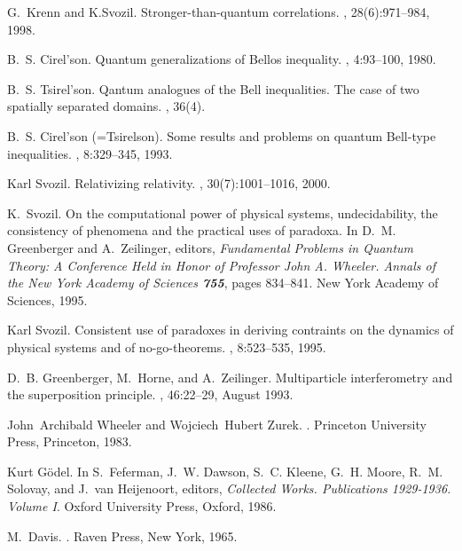 \begin{thebibliography}{10}
G.~Krenn and K.Svozil.
\newblock Stronger-than-quantum correlations.
, 28(6):971--984, 1998.

B.~S. Cirel'son.
\newblock Quantum generalizations of {B}ellos inequality.
, 4:93--100, 1980.

B.~S. Tsirel'son.
\newblock Qantum analogues of the {B}ell inequalities. {T}he case of two
  spatially separated domains.
, 36(4).

B.~S. {Cirel'son (=Tsirelson)}.
\newblock Some results and problems on quantum {B}ell-type inequalities.
, 8:329--345, 1993.

Karl Svozil.
\newblock Relativizing relativity.
, 30(7):1001--1016, 2000.

K.~Svozil.
\newblock On the computational power of physical systems, undecidability, the
  consistency of phenomena and the practical uses of paradoxa.
\newblock In D.~M. Greenberger and A.~Zeilinger, editors, {\em Fundamental
  Problems in Quantum Theory: A Conference Held in Honor of Professor John A.
  Wheeler. Annals of the New York Academy of Sciences {\bf 755}}, pages
  834--841. New York Academy of Sciences, 1995.

Karl Svozil.
\newblock Consistent use of paradoxes in deriving contraints on the dynamics of
  physical systems and of no-go-theorems.
, 8:523--535, 1995.

D.~B. Greenberger, M.~Horne, and A.~Zeilinger.
\newblock Multiparticle interferometry and the superposition principle.
, 46:22--29, August 1993.

John~Archibald Wheeler and Wojciech~Hubert Zurek.
.
\newblock Princeton University Press, Princeton, 1983.

Kurt G{\"{o}}del.
\newblock In S.~Feferman, J.~W. Dawson, S.~C. Kleene, G.~H. Moore, R.~M.
  Solovay, and J.~van Heijenoort, editors, {\em Collected Works. Publications
  1929-1936. Volume {I}}. Oxford University Press, Oxford, 1986.

M.~Davis.
.
\newblock Raven Press, New York, 1965.

\end{thebibliography}


